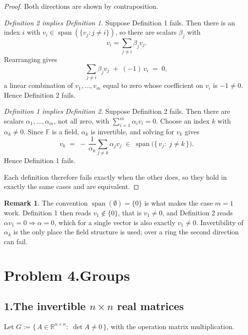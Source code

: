 \documentclass[11pt]{article}
\DeclareMathOperator{\spn}{span}
\theoremstyle{definition}\newtheorem*{definition}{Definition}
\theoremstyle{definition}
\newtheorem{remark}{Remark}
\begin{document}
\begin{proof}
Both directions are shown by contraposition.

\emph{Definition 2 implies Definition 1.} Suppose Definition 1 fails.
Then there is an index $i$ with
$v_i \in \spn(\{v_j : j \ne i\})$, so there are scalars $\beta_j$ with
\[
  v_i = \sum_{j \ne i} \beta_j v_j .
\]
Rearranging gives
\[
  \sum_{j \ne i} \beta_j v_j \;+\; (-1)\, v_i \;=\; 0,
\]
a linear combination of $v_1,\dots,v_m$ equal to zero whose coefficient
on $v_i$ is $-1 \ne 0$. Hence Definition 2 fails.

\emph{Definition 1 implies Definition 2.} Suppose Definition 2 fails.
Then there are scalars $\alpha_1,\dots,\alpha_m$, not all zero, with
$\sum_{i=1}^{m} \alpha_i v_i = 0$. Choose an index $k$ with
$\alpha_k \ne 0$. Since $\mathbb{F}$ is a field, $\alpha_k$ is
invertible, and solving for $v_k$ gives
\[
  v_k \;=\; -\,\frac{1}{\alpha_k} \sum_{j \ne k} \alpha_j v_j
  \;\in\; \spn\big(\{\, v_j :\; j \ne k \,\}\big) .
\]
Hence Definition 1 fails.

Each definition therefore fails exactly when the other does, so they
hold in exactly the same cases and are equivalent.
\end{proof}

\begin{remark}
The convention $\spn(\emptyset) = \{0\}$ is what makes the case $m = 1$
work. Definition 1 then reads $v_1 \notin \{0\}$, that is $v_1 \ne 0$,
and Definition 2 reads $\alpha v_1 = 0 \Rightarrow \alpha = 0$, which for
a single vector is also exactly $v_1 \ne 0$. Invertibility of $\alpha_k$
is the only place the field structure is used; over a ring the second
direction can fail.
\end{remark}

\newpage
\section*{Problem 4.\quad Groups \quad[20 pts]}

\subsection*{1.\quad The invertible $n \times n$ real matrices}

Let $G := \{\, A \in \mathbb{R}^{n \times n} :\; \det A \ne 0 \,\}$,
with the operation matrix multiplication.
\end{document}
